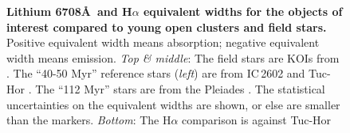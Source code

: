\documentclass[12pt,twocolumn,tighten,linenumbers,trackchanges]{aastex63}
\begin{document}
\begin{figure}[tp]
	\begin{center}
		\leavevmode
	
		\vspace{-0.35cm}
	
		\vspace{-0.35cm}
	\end{center}
	\vspace{-0.6cm}
	\caption{
    {\bf Lithium 6708\AA\ and H$\alpha$ equivalent widths for the
    objects of interest compared to young open clusters and field
    stars. } Positive equivalent width means absorption; negative
    equivalent width means emission.  
    {\it Top \& middle}:
    The field stars are KOIs from
    \citet{berger_identifying_2018}.  The ``40-50 Myr'' reference
    stars ({\it left}) are from IC\,2602 \citep{randich_gaiaeso_2018} and
    Tuc-Hor \citep{kraus_stellar_2014}.  The ``112 Myr'' stars
    are from the Pleiades
    \citep{soderblom_evolution_1993,jones_evolution_1996,bouvier_pleiades_lirot_2018}.
    The statistical uncertainties on
    the equivalent widths are shown, or else are
    smaller than the markers.
    {\it Bottom}:
    The H$\alpha$ comparison is against Tuc-Hor
    \citep[$\approx$$40$\,Myr;][]{kraus_stellar_2014}
    \label{fig:lithium}
	}
\end{figure}
\end{document}
